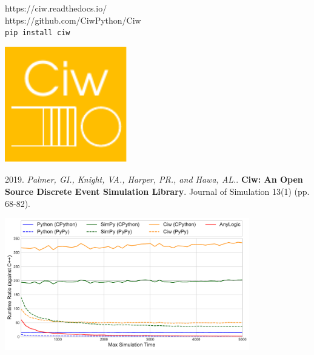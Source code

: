 \documentclass[xcolor={table}]{beamer}
\begin{document}
\begin{frame}

\begin{center}
\footnotesize{\textcolor{textorange}{https://ciw.readthedocs.io/}}\\
\footnotesize{\textcolor{textorange}{https://github.com/CiwPython/Ciw}}\\
\footnotesize{\textcolor{textorange}{\texttt{pip install ciw}}}
\end{center}

\begin{center}
\includegraphics[width=0.4\textwidth]{../images/ciwlogo}
\end{center}

\scriptsize{\textcolor{textorange}{2019. \textit{Palmer, GI., Knight, VA., Harper, PR., and Hawa, AL.}. \textbf{Ciw: An Open Source Discrete Event Simulation Library}. Journal of Simulation 13(1) (pp. 68-82).}}
\end{frame}

\begin{frame}
\begin{center}

\end{center}
\end{frame}

\begin{frame}
\begin{center}
\includegraphics[width=0.8\textwidth]{../OR60/runtimes}
\end{center}
\end{frame}
\end{document}
